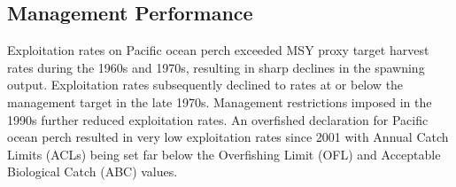 \documentclass[12pt,]{article}
\begin{document}
\FloatBarrier

\subsection*{Management Performance}\label{management-performance}

Exploitation rates on Pacific ocean perch exceeded MSY proxy target
harvest rates during the 1960s and 1970s, resulting in sharp declines in
the spawning output. Exploitation rates subsequently declined to rates
at or below the management target in the late 1970s. Management
restrictions imposed in the 1990s further reduced exploitation rates. An
overfished declaration for Pacific ocean perch resulted in very low
exploitation rates since 2001 with Annual Catch Limits (ACLs) being set
far below the Overfishing Limit (OFL) and Acceptable Biological Catch
(ABC) values.

\begin{table}[ht]
\centering
\caption{Recent trend in total catch and  
                              landings (mt) relative to the management guidelines. 
                              Estimated total catch reflect the landings 
                              plus the model estimated discarded biomass.} 
\label{tab:mnmgt_perform}
\end{table}
\end{document}
